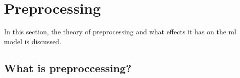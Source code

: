 \section{Preprocessing}
In this section, the theory of preprocessing and what effects it has on the \gls{ml} model is discussed. 


\subsection{What is preproccessing?}

